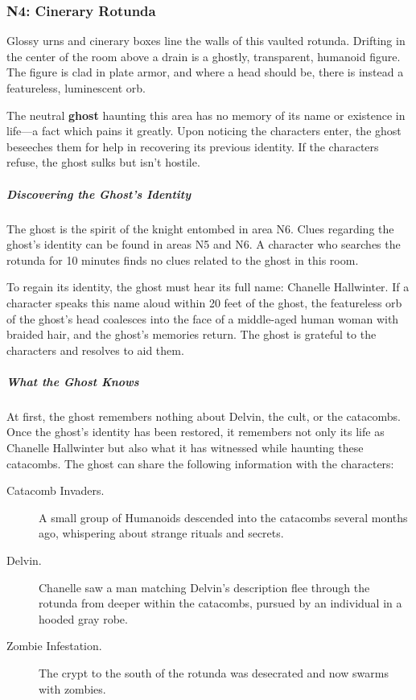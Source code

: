 \documentclass[10pt,a4paper,twoside,fancy,bg=print,twocolumn,openany,nodeprecatedcode]{dndbook}
\begin{document}
\subsubsection{N4: Cinerary Rotunda}
\begin{DndReadAloud}{}
Glossy urns and cinerary boxes line the walls of this vaulted rotunda. Drifting in the center of the room above a drain is a ghostly, transparent, humanoid figure. The figure is clad in plate armor, and where a head should be, there is instead a featureless, luminescent orb.

\end{DndReadAloud}

The neutral \textbf{ghost} haunting this area has no memory of its name or existence in life—a fact which pains it greatly. Upon noticing the characters enter, the ghost beseeches them for help in recovering its previous identity. If the characters refuse, the ghost sulks but isn't hostile.

\subparagraph{Discovering the Ghost's Identity}
The ghost is the spirit of the knight entombed in area N6. Clues regarding the ghost's identity can be found in areas N5 and N6. A character who searches the rotunda for 10 minutes finds no clues related to the ghost in this room.

To regain its identity, the ghost must hear its full name: Chanelle Hallwinter. If a character speaks this name aloud within 20 feet of the ghost, the featureless orb of the ghost's head coalesces into the face of a middle-aged human woman with braided hair, and the ghost's memories return. The ghost is grateful to the characters and resolves to aid them.

\subparagraph{What the Ghost Knows}
At first, the ghost remembers nothing about Delvin, the cult, or the catacombs. Once the ghost's identity has been restored, it remembers not only its life as Chanelle Hallwinter but also what it has witnessed while haunting these catacombs. The ghost can share the following information with the characters:


\begin{description}
\item[Catacomb Invaders.]
A small group of Humanoids descended into the catacombs several months ago, whispering about strange rituals and secrets.
\item[Delvin.]
Chanelle saw a man matching Delvin's description flee through the rotunda from deeper within the catacombs, pursued by an individual in a hooded gray robe.
\item[Zombie Infestation.]
The crypt to the south of the rotunda was desecrated and now swarms with zombies.
\end{description}
\end{document}
